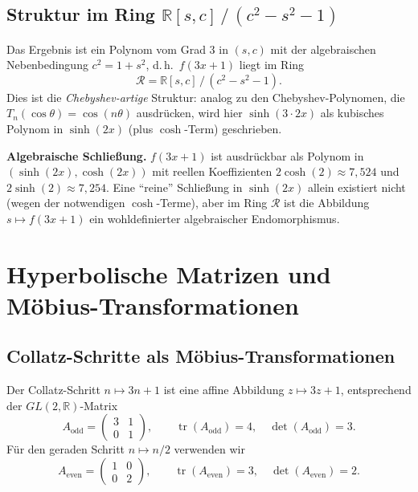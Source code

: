 \documentclass[12pt,a4paper]{article}
\newcommand{\sinh}{\operatorname{sinh}}
\renewcommand{\cosh}{\operatorname{cosh}}
\newcommand{\tr}{\operatorname{tr}}
\newcommand{\R}{\mathbb{R}}
\begin{document}
\subsection{Struktur im Ring $\R[s,c]\,/\,(c^2-s^2-1)$}

Das Ergebnis ist ein Polynom vom Grad 3 in $(s,c)$ mit der algebraischen
Nebenbedingung $c^2 = 1 + s^2$, d.\,h.\ $f(3x+1)$ liegt im Ring
\[
  \mathcal{R} = \R[s, c]\,\big/\,(c^2 - s^2 - 1).
\]
Dies ist die \emph{Chebyshev-artige} Struktur: analog zu den Chebyshev-Polynomen,
die $T_n(\cos\theta) = \cos(n\theta)$ ausdrücken, wird hier $\sinh(3 \cdot 2x)$
als kubisches Polynom in $\sinh(2x)$ (plus $\cosh$-Term) geschrieben.

\begin{tcolorbox}[ergebnis]
\textbf{Algebraische Schließung.}
$f(3x+1)$ ist ausdrückbar als Polynom in $(\sinh(2x), \cosh(2x))$ mit reellen Koeffizienten
$2\cosh(2) \approx 7{,}524$ und $2\sinh(2) \approx 7{,}254$.
Eine ``reine'' Schließung in $\sinh(2x)$ allein existiert nicht
(wegen der notwendigen $\cosh$-Terme), aber im Ring $\mathcal{R}$ ist die
Abbildung $s \mapsto f(3x+1)$ ein wohldefinierter algebraischer Endomorphismus.
\end{tcolorbox}

\section{Hyperbolische Matrizen und Möbius-Transformationen}

\subsection{Collatz-Schritte als Möbius-Transformationen}

Der Collatz-Schritt $n \mapsto 3n+1$ ist eine affine Abbildung
$z \mapsto 3z+1$, entsprechend der $GL(2,\R)$-Matrix
\[
  A_{\text{odd}} = \begin{pmatrix} 3 & 1 \\ 0 & 1 \end{pmatrix},
  \qquad
  \tr(A_{\text{odd}}) = 4, \quad \det(A_{\text{odd}}) = 3.
\]
Für den geraden Schritt $n \mapsto n/2$ verwenden wir
\[
  A_{\text{even}} = \begin{pmatrix} 1 & 0 \\ 0 & 2 \end{pmatrix},
  \qquad
  \tr(A_{\text{even}}) = 3, \quad \det(A_{\text{even}}) = 2.
\]
\end{document}

